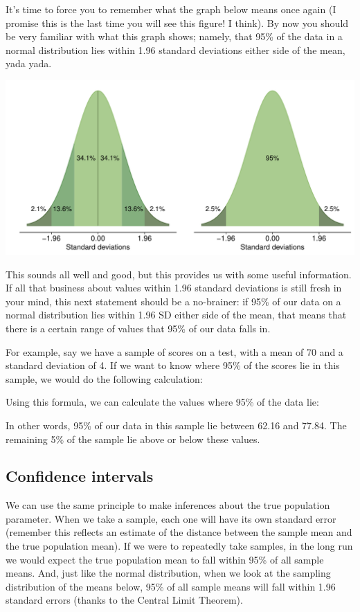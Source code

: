 \documentclass[
]{book}
\begin{document}
It's time to force you to remember what the graph below means once again (I promise this is the last time you will see this figure! I think). By now you should be very familiar with what this graph shows; namely, that 95\% of the data in a normal distribution lies within 1.96 standard deviations either side of the mean, yada yada.

\begin{center}\includegraphics{_main_files/figure-latex/unnamed-chunk-86-1} \end{center}

This sounds all well and good, but this provides us with some useful information. If all that business about values within 1.96 standard deviations is still fresh in your mind, this next statement should be a no-brainer: if 95\% of our data on a normal distribution lies within 1.96 SD either side of the mean, that means that there is a certain range of values that 95\% of our data falls in.

For example, say we have a sample of scores on a test, with a mean of 70 and a standard deviation of 4. If we want to know where 95\% of the scores lie in this sample, we would do the following calculation:

Using this formula, we can calculate the values where 95\% of the data lie:

In other words, 95\% of our data in this sample lie between 62.16 and 77.84. The remaining 5\% of the sample lie above or below these values.

\hypertarget{confidence-intervals-1}{%
\subsection{Confidence intervals}\label{confidence-intervals-1}}

We can use the same principle to make inferences about the true population parameter. When we take a sample, each one will have its own standard error (remember this reflects an estimate of the distance between the sample mean and the true population mean). If we were to repeatedly take samples, in the long run we would expect the true population mean to fall within 95\% of all sample means. And, just like the normal distribution, when we look at the sampling distribution of the means below, 95\% of all sample means will fall within 1.96 standard errors (thanks to the Central Limit Theorem).
\end{document}
